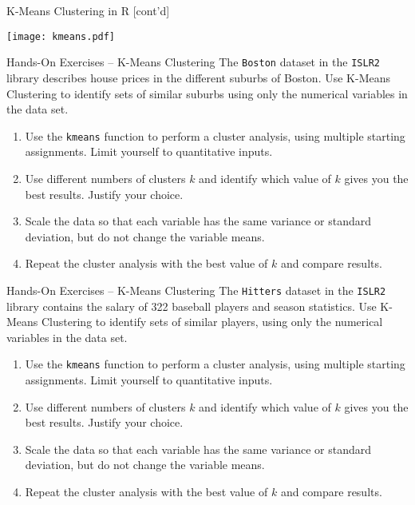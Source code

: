 \documentclass[ignorenonframetext,xcolor=x11names]{beamer}
\begin{document}
\begin{frame}{K-Means Clustering in R \small [cont'd]}
\centering

\texttt{[image: kmeans.pdf]}
\end{frame}

\begin{frame}{Hands-On Exercises -- K-Means Clustering}
The \texttt{Boston} dataset in the \texttt{ISLR2} library describes house prices in the different suburbs of Boston. Use K-Means Clustering to identify sets of similar suburbs using only the numerical variables in the data set.
\begin{enumerate}
   \item Use the \texttt{kmeans} function to perform a cluster analysis, using multiple starting assignments. Limit yourself to quantitative inputs.
   \item Use different numbers of clusters $k$ and identify which value of $k$ gives you the best results. Justify your choice.
   \item Scale the data so that each variable has the same variance or standard deviation, but do not change the variable means. 
   \item Repeat the cluster analysis with the best value of $k$ and compare results.\end{enumerate}
\end{frame}

\begin{frame}{Hands-On Exercises -- K-Means Clustering}
The \texttt{Hitters} dataset in the \texttt{ISLR2} library contains the salary of 322 baseball players and season statistics. Use K-Means Clustering to identify sets of similar players, using only the numerical variables in the data set.

\begin{enumerate}
   \item Use the \texttt{kmeans} function to perform a cluster analysis, using multiple starting assignments. Limit yourself to quantitative inputs.
   \item Use different numbers of clusters $k$ and identify which value of $k$ gives you the best results. Justify your choice.
   \item Scale the data so that each variable has the same variance or standard deviation, but do not change the variable means. 
   \item Repeat the cluster analysis with the best value of $k$ and compare results.\end{enumerate}
\end{frame}
\end{document}
